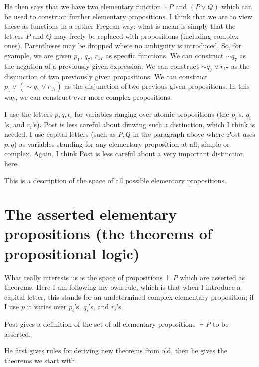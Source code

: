 \documentclass[12pt]{article}
\begin{document}
He then says that we have two elementary function $\sim P$ and $(P \vee Q)$ which can be used to construct further elementary propositions.  I think that we are to view these as functions in a rather Fregean way:  what is mean is simply that the letters $P$ and $Q$ may freely be replaced with propositions (including complex ones).  Parentheses may be dropped where no ambiguity is introduced.  So, for example, we are given $p_1$, $q_7$, $r_{17}$ as specific functions.  We can construct $\sim q_7$ as the negation of a previously given expression.  We can construct $\sim q_7 \vee r_{17}$ as the disjunction of two previously given propositions. We can construct $p_1 \vee (\sim q_7 \vee r_{17})$ as the disjunction of two previous given propositions.  In this way, we can construct ever more complex propositions.

I use the letters $p, q, t_i$ for variables ranging over atomic propositions (the $p_i$'s, $q_i$'s, and $r_i$'s).  Post is less careful about drawing such a distinction, which I think is needed.  I use capital letters (such as $P,Q$ in the paragraph above where Post uses $p,q$) as variables standing for any elementary proposition at all, simple or complex.  Again, I think Post is less careful about a very important distinction here.

This is a description of the space of all possible elementary propositions.

\section{The asserted elementary propositions (the theorems of propositional logic)}

What really interests us is the space of propositions $\vdash P$ which are asserted as theorems.  Here I am following my own rule, which is that when I introduce a capital letter,
this stands for an undetermined complex elementary proposition;  if I use $p$ it varies over $p_i$'s, $q_i$'s, and $r_i$'s.

Post gives a definition of the set of all elementary propositions $\vdash P$ to be asserted.

He first gives rules for deriving new theorems from old, then he gives the theorems we start with.
\end{document}
